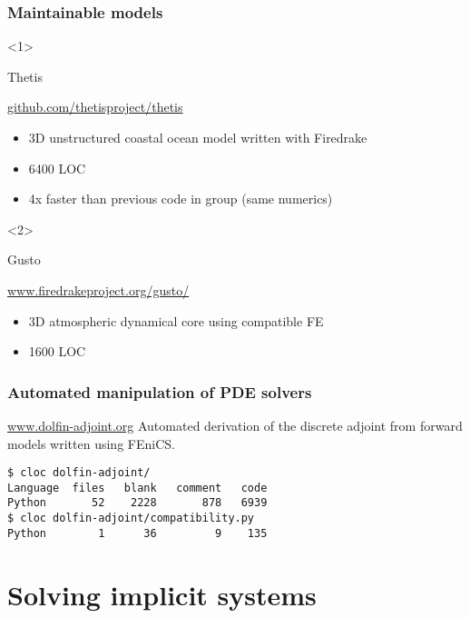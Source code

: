 \documentclass[presentation]{beamer}
\begin{document}
\begin{frame}
  \frametitle{Maintainable models}
  \begin{onlyenv}<1>
    \begin{block}{Thetis}
      \begin{center}
        \url{github.com/thetisproject/thetis}
      \end{center}
      \begin{itemize}
      \item 3D unstructured coastal ocean model written with Firedrake
      \item 6400 LOC
      \item 4x faster than previous code in group (same numerics)
      \end{itemize}
    \end{block}
  \end{onlyenv}
  \begin{onlyenv}<2>
    \begin{block}{Gusto}
      \begin{center}
        \url{www.firedrakeproject.org/gusto/}
      \end{center}
      \begin{itemize}
      \item 3D atmospheric dynamical core using compatible FE
      \item 1600 LOC
      \end{itemize}
    \end{block}
  \end{onlyenv}
\end{frame}

\begin{frame}[fragile]
  \frametitle{Automated manipulation of PDE solvers}
  \begin{block}{\url{www.dolfin-adjoint.org}}
    Automated derivation of the discrete adjoint from forward models
    written using FEniCS.

\begin{verbatim}
$ cloc dolfin-adjoint/
Language  files   blank   comment   code
Python       52    2228       878   6939
$ cloc dolfin-adjoint/compatibility.py
Python        1      36         9    135
\end{verbatim}
  \end{block}  
\end{frame}

\section{Solving implicit systems}
\end{document}
